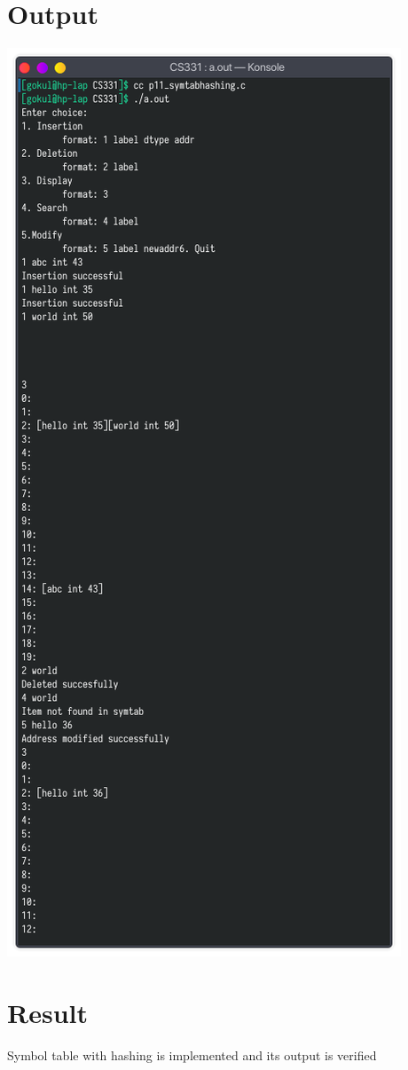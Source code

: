 \documentclass[13pt,oneside]{book}
\begin{document}
    \section*{Output}
    \includegraphics[]{img/p11.png}
    
\Large
\section*{Result}
\large
Symbol table with hashing is implemented and its output is verified
\end{document}
